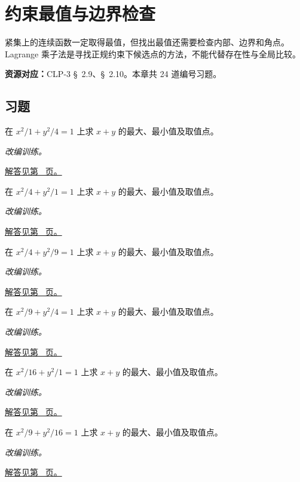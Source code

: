 \documentclass[12pt,fontset=fandol]{ctexart}
\begin{document}
\clearpage
\section{约束最值与边界检查}\label{sec:ch35}
紧集上的连续函数一定取得最值，但找出最值还需要检查内部、边界和角点。Lagrange 乘子法是寻找正规约束下候选点的方法，不能代替存在性与全局比较。

\textbf{资源对应：}CLP-3 \S~2.9、\S~2.10。本章共 24 道编号习题。
\subsection{习题}
\begin{example}[椭圆上的线性函数最值]\label{ex:c35q1}
在 $x^2/1+y^2/4=1$ 上求 $x+y$ 的最大、最小值及取值点。
\par\textit{改编训练。}\par\hyperref[ans:c35q1]{解答见第~\pageref{ans:c35q1} 页。}
\end{example}
\begin{example}[椭圆上的线性函数最值]\label{ex:c35q2}
在 $x^2/4+y^2/1=1$ 上求 $x+y$ 的最大、最小值及取值点。
\par\textit{改编训练。}\par\hyperref[ans:c35q2]{解答见第~\pageref{ans:c35q2} 页。}
\end{example}
\begin{example}[椭圆上的线性函数最值]\label{ex:c35q3}
在 $x^2/4+y^2/9=1$ 上求 $x+y$ 的最大、最小值及取值点。
\par\textit{改编训练。}\par\hyperref[ans:c35q3]{解答见第~\pageref{ans:c35q3} 页。}
\end{example}
\begin{example}[椭圆上的线性函数最值]\label{ex:c35q4}
在 $x^2/9+y^2/4=1$ 上求 $x+y$ 的最大、最小值及取值点。
\par\textit{改编训练。}\par\hyperref[ans:c35q4]{解答见第~\pageref{ans:c35q4} 页。}
\end{example}
\begin{example}[椭圆上的线性函数最值]\label{ex:c35q5}
在 $x^2/16+y^2/1=1$ 上求 $x+y$ 的最大、最小值及取值点。
\par\textit{改编训练。}\par\hyperref[ans:c35q5]{解答见第~\pageref{ans:c35q5} 页。}
\end{example}
\begin{example}[椭圆上的线性函数最值]\label{ex:c35q6}
在 $x^2/9+y^2/16=1$ 上求 $x+y$ 的最大、最小值及取值点。
\par\textit{改编训练。}\par\hyperref[ans:c35q6]{解答见第~\pageref{ans:c35q6} 页。}
\end{example}
\end{document}
